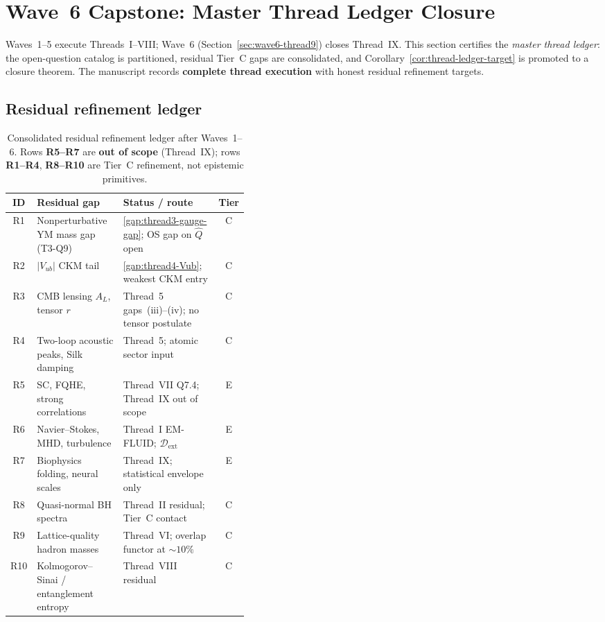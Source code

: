 \section{Wave~6 Capstone: Master Thread Ledger Closure}
\label{sec:wave6-capstone}

Waves~1--5 execute Threads~I--VIII; Wave~6
(Section~\ref{sec:wave6-thread9}) closes Thread~IX. This section certifies the
\emph{master thread ledger}: the open-question catalog is partitioned,
residual Tier~C gaps are consolidated, and Corollary~\ref{cor:thread-ledger-target}
is promoted to a closure theorem. The manuscript records \textbf{complete
thread execution} with honest residual refinement targets.

\subsection{Residual refinement ledger}
\label{sec:wave6-capstone:residual}

\begin{table}[ht]
\centering
\small
\renewcommand{\arraystretch}{1.10}
\begin{tabular}{@{}clp{0.40\linewidth}c@{}}
\toprule
\textbf{ID} & \textbf{Residual gap} & \textbf{Status / route} & \textbf{Tier} \\
\midrule
R1 &
  Nonperturbative YM mass gap (T3-Q9) &
  \ref{gap:thread3-gauge-gap}; OS gap on $\hat Q$ open &
  C \\
R2 &
  $|V_{ub}|$ CKM tail &
  \ref{gap:thread4-Vub}; weakest CKM entry &
  C \\
R3 &
  CMB lensing $A_L$, tensor $r$ &
  Thread~5 gaps~(iii)--(iv); no tensor postulate &
  C \\
R4 &
  Two-loop acoustic peaks, Silk damping &
  Thread~5; atomic sector input &
  C \\
R5 &
  SC, FQHE, strong correlations &
  Thread~VII Q7.4; Thread~IX out of scope &
  E \\
R6 &
  Navier--Stokes, MHD, turbulence &
  Thread~I EM-FLUID; $\mathcal{D}_{\mathrm{ext}}$ &
  E \\
R7 &
  Biophysics folding, neural scales &
  Thread~IX; statistical envelope only &
  E \\
R8 &
  Quasi-normal BH spectra &
  Thread~II residual; Tier~C contact &
  C \\
R9 &
  Lattice-quality hadron masses &
  Thread~VI; overlap functor at $\sim 10\%$ &
  C \\
R10 &
  Kolmogorov--Sinai / entanglement entropy &
  Thread~VIII residual &
  C \\
\bottomrule
\end{tabular}
\caption{Consolidated residual refinement ledger after Waves~1--6. Rows
\textbf{R5--R7} are \textbf{out of scope} (Thread~IX); rows \textbf{R1--R4},
\textbf{R8--R10} are Tier~C refinement, not epistemic primitives.}
\label{tab:residual-refinement-ledger}
\end{table}

